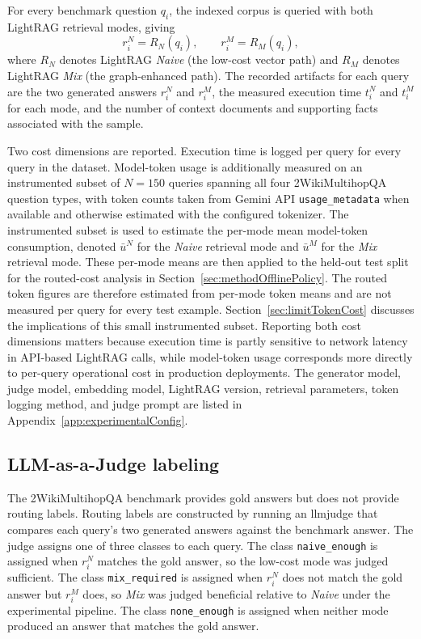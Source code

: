 \documentclass[english, bibtex]{kththesis}               %
\numberwithin{listing}{chapter}
\begin{document}
For every benchmark question \(q_i\), the indexed corpus is queried with both LightRAG retrieval modes, giving
\begin{equation}
\label{eq:dualModeOutputs}
r_i^{N} = R_N(q_i),
\qquad
r_i^{M} = R_M(q_i),
\end{equation}
where \(R_N\) denotes LightRAG \emph{Naive} (the low-cost vector path) and \(R_M\) denotes LightRAG \emph{Mix} (the graph-enhanced path). The recorded artifacts for each query are the two generated answers \(r_i^N\) and \(r_i^M\), the measured execution time \(t_i^N\) and \(t_i^M\) for each mode, and the number of context documents and supporting facts associated with the sample.

Two cost dimensions are reported. Execution time is logged per query for every query in the dataset. Model-token usage is additionally measured on an instrumented subset of \(N = 150\) queries spanning all four 2WikiMultihopQA question types, with token counts taken from Gemini API \texttt{usage\_metadata} when available and otherwise estimated with the configured tokenizer. The instrumented subset is used to estimate the per-mode mean model-token consumption, denoted $\bar{u}^N$ for the \emph{Naive} retrieval mode and $\bar{u}^M$ for the \emph{Mix} retrieval mode. These per-mode means are then applied to the held-out test split for the routed-cost analysis in Section~\ref{sec:methodOfflinePolicy}. The routed token figures are therefore estimated from per-mode token means and are not measured per query for every test example. Section~\ref{sec:limitTokenCost} discusses the implications of this small instrumented subset. Reporting both cost dimensions matters because execution time is partly sensitive to network latency in API-based LightRAG calls, while model-token usage corresponds more directly to per-query operational cost in production deployments. The generator model, judge model, embedding model, LightRAG version, retrieval parameters, token logging method, and judge prompt are listed in Appendix~\ref{app:experimentalConfig}.

\subsection{LLM-as-a-Judge labeling}
\label{sec:methodJudge}

The 2WikiMultihopQA benchmark provides gold answers but does not provide routing labels. Routing labels are constructed by running an \gls{llmjudge} \cite{zheng2023judge} that compares each query's two generated answers against the benchmark answer. The judge assigns one of three classes to each query. The class \texttt{naive\_enough} is assigned when \(r_i^N\) matches the gold answer, so the low-cost mode was judged sufficient. The class \texttt{mix\_required} is assigned when \(r_i^N\) does not match the gold answer but \(r_i^M\) does, so \emph{Mix} was judged beneficial relative to \emph{Naive} under the experimental pipeline. The class \texttt{none\_enough} is assigned when neither mode produced an answer that matches the gold answer.
\end{document}
